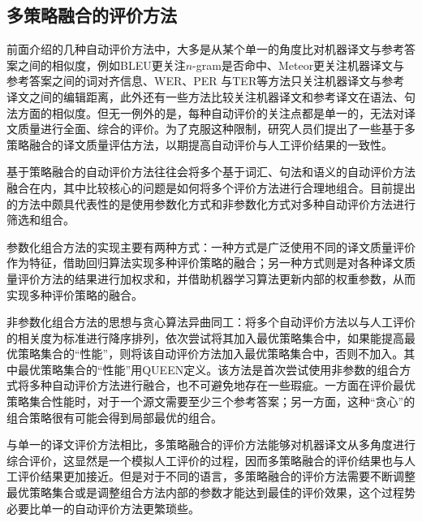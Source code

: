 \subsection{多策略融合的评价方法}\label{Evaluation method of Multi Strategy fusion}

\parinterval 前面介绍的几种自动评价方法中，大多是从某个单一的角度比对机器译文与参考答案之间的相似度，例如BLEU更关注$n$-gram是否命中、Meteor更关注机器译文与参考答案之间的词对齐信息、WER、PER 与TER等方法只关注机器译文与参考译文之间的编辑距离，此外还有一些方法比较关注机器译文和参考译文在语法、句法方面的相似度。但无一例外的是，每种自动评价的关注点都是单一的，无法对译文质量进行全面、综合的评价。为了克服这种限制，研究人员们提出了一些基于多策略融合的译文质量评估方法，以期提高自动评价与人工评价结果的一致性。

\parinterval 基于策略融合的自动评价方法往往会将多个基于词汇、句法和语义的自动评价方法融合在内，其中比较核心的问题是如何将多个评价方法进行合理地组合。目前提出的方法中颇具代表性的是使用参数化方式和非参数化方式对多种自动评价方法进行筛选和组合。

\parinterval 参数化组合方法的实现主要有两种方式：一种方式是广泛使用不同的译文质量评价作为特征，借助回归算法实现多种评价策略的融合；另一种方式则是对各种译文质量评价方法的结果进行加权求和，并借助机器学习算法更新内部的权重参数，从而实现多种评价策略的融合。

\parinterval 非参数化组合方法的思想与贪心算法异曲同工：将多个自动评价方法以与人工评价的相关度为标准进行降序排列，依次尝试将其加入最优策略集合中，如果能提高最优策略集合的“性能”，则将该自动评价方法加入最优策略集合中，否则不加入。其中最优策略集合的“性能”用QUEEN定义。该方法是首次尝试使用非参数的组合方式将多种自动评价方法进行融合，也不可避免地存在一些瑕疵。一方面在评价最优策略集合性能时，对于一个源文需要至少三个参考答案；另一方面，这种“贪心”的组合策略很有可能会得到局部最优的组合。

\parinterval 与单一的译文评价方法相比，多策略融合的评价方法能够对机器译文从多角度进行综合评价，这显然是一个模拟人工评价的过程，因而多策略融合的评价结果也与人工评价结果更加接近。但是对于不同的语言，多策略融合的评价方法需要不断调整最优策略集合或是调整组合方法内部的参数才能达到最佳的评价效果，这个过程势必要比单一的自动评价方法更繁琐些。


